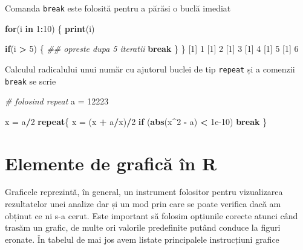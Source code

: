 \documentclass[]{article}
\newenvironment{Shaded}{\begin{snugshade}}{\end{snugshade}}
\newcommand{\CommentTok}[1]{\textcolor[rgb]{0.56,0.35,0.01}{\textit{#1}}}
\newcommand{\ControlFlowTok}[1]{\textcolor[rgb]{0.13,0.29,0.53}{\textbf{#1}}}
\newcommand{\DecValTok}[1]{\textcolor[rgb]{0.00,0.00,0.81}{#1}}
\newcommand{\FloatTok}[1]{\textcolor[rgb]{0.00,0.00,0.81}{#1}}
\newcommand{\KeywordTok}[1]{\textcolor[rgb]{0.13,0.29,0.53}{\textbf{#1}}}
\newcommand{\NormalTok}[1]{#1}
\newcommand{\OperatorTok}[1]{\textcolor[rgb]{0.81,0.36,0.00}{\textbf{#1}}}
\newcommand{\StringTok}[1]{\textcolor[rgb]{0.31,0.60,0.02}{#1}}
\begin{document}
Comanda \texttt{break} este folosită pentru a părăsi o buclă imediat

\begin{Shaded}
\begin{Highlighting}[]
\ControlFlowTok{for}\NormalTok{(i }\ControlFlowTok{in} \DecValTok{1}\OperatorTok{:}\DecValTok{10}\NormalTok{) \{}
      \KeywordTok{print}\NormalTok{(i)}

      \ControlFlowTok{if}\NormalTok{(i }\OperatorTok{>}\StringTok{ }\DecValTok{5}\NormalTok{) \{}
              \CommentTok{## opreste dupa 5 iteratii}
              \ControlFlowTok{break}  
\NormalTok{      \}     }
\NormalTok{\}}
\NormalTok{[}\DecValTok{1}\NormalTok{] }\DecValTok{1}
\NormalTok{[}\DecValTok{1}\NormalTok{] }\DecValTok{2}
\NormalTok{[}\DecValTok{1}\NormalTok{] }\DecValTok{3}
\NormalTok{[}\DecValTok{1}\NormalTok{] }\DecValTok{4}
\NormalTok{[}\DecValTok{1}\NormalTok{] }\DecValTok{5}
\NormalTok{[}\DecValTok{1}\NormalTok{] }\DecValTok{6}
\end{Highlighting}
\end{Shaded}

Calculul radicalului unui număr cu ajutorul buclei de tip
\texttt{repeat} și a comenzii \texttt{break} se scrie

\begin{Shaded}
\begin{Highlighting}[]
\CommentTok{# folosind repeat}
\NormalTok{a =}\StringTok{ }\DecValTok{12223}

\NormalTok{x =}\StringTok{ }\NormalTok{a}\OperatorTok{/}\DecValTok{2}
\ControlFlowTok{repeat}\NormalTok{\{}
\NormalTok{  x =}\StringTok{ }\NormalTok{(x }\OperatorTok{+}\StringTok{ }\NormalTok{a}\OperatorTok{/}\NormalTok{x)}\OperatorTok{/}\DecValTok{2}
  \ControlFlowTok{if}\NormalTok{ (}\KeywordTok{abs}\NormalTok{(x}\OperatorTok{^}\DecValTok{2} \OperatorTok{-}\StringTok{ }\NormalTok{a) }\OperatorTok{<}\StringTok{ }\FloatTok{1e-10}\NormalTok{) }\ControlFlowTok{break}
\NormalTok{\}}
\end{Highlighting}
\end{Shaded}

\hypertarget{elemente-de-graficux103-uxeen-r}{%
\section{Elemente de grafică în
R}\label{elemente-de-graficux103-uxeen-r}}

Graficele reprezintă, în general, un instrument folositor pentru
vizualizarea rezultatelor unei analize dar și un mod prin care se poate
verifica dacă am obținut ce ni s-a cerut. Este important să folosim
opțiunile corecte atunci când trasăm un grafic, de multe ori valorile
predefinite putând conduce la figuri eronate. În tabelul de mai jos avem
listate principalele instrucțiuni grafice
\end{document}
